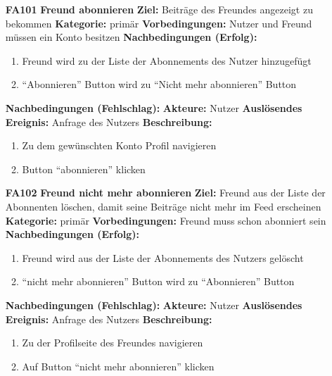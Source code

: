 \documentclass[parskip=full]{scrartcl}
\begin{document}
\begin{itemize}[nosep]
			\item[\textbf{\large FA101}]\textbf{\large Freund abonnieren}
				\newline\newline \textbf{Ziel:} Beiträge des Freundes angezeigt zu bekommen
				\newline \textbf{Kategorie:} primär
				\newline \textbf{Vorbedingungen:} Nutzer und Freund müssen ein Konto besitzen
				\newline \textbf{Nachbedingungen (Erfolg):} 
				\begin{enumerate}[nosep]
					\item Freund wird zu der Liste der Abonnements des Nutzer hinzugefügt
					\item “Abonnieren” Button wird zu “Nicht mehr abonnieren” Button
				\end{enumerate}
				\textbf{Nachbedingungen (Fehlschlag):}
				\newline \textbf{Akteure:} Nutzer
				\newline \textbf{Auslösendes Ereignis:} Anfrage des Nutzers
				\newline \textbf{Beschreibung:}
				\begin{enumerate}[nosep]
					\item Zu dem gewünschten Konto Profil navigieren
					\item Button “abonnieren” klicken
				\end{enumerate}
			
			\item[\textbf{\large FA102}]\textbf{\large Freund nicht mehr abonnieren}
				\newline \textbf{Ziel:} Freund aus der Liste der Abonnenten löschen, damit seine Beiträge nicht mehr im \gls{Feed} erscheinen
				\newline \textbf{Kategorie:} primär
				\newline \textbf{Vorbedingungen:} Freund muss schon abonniert sein
				\newline \textbf{Nachbedingungen (Erfolg):} 
				\begin{enumerate}[nosep]
					\item Freund wird aus der Liste der Abonnements des Nutzers gelöscht
					\item “nicht mehr abonnieren” Button wird zu “Abonnieren” Button
				\end{enumerate}
				\textbf{Nachbedingungen (Fehlschlag):}
				\newline \textbf{Akteure:} Nutzer
				\newline \textbf{Auslösendes Ereignis:} Anfrage des Nutzers
				\newline \textbf{Beschreibung:}
				\begin{enumerate}[nosep]
					\item Zu der Profilseite des Freundes navigieren
					\item Auf Button “nicht mehr abonnieren” klicken
				\end{enumerate}
		\end{itemize}
		
\end{document}
